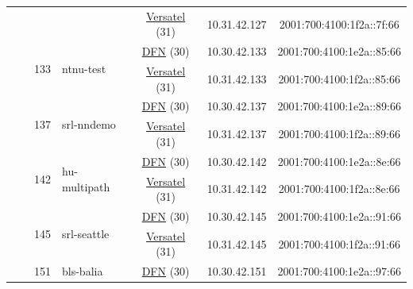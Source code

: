 \begin{small}
\begin{center}
\begin{longtable}{|c|c|c|c|c|c|c|c|}
  &  &  &  & \multicolumn{2}{|c|}{\tiny{\href{http://www.versatel.de}{Versatel} (31)}} & \tiny{10.31.42.127} & \tiny{2001:700:4100:1f2a::7f:66} \\* \cline{3-3}\cline{4-4}\cline{5-5}\cline{6-6}\cline{7-7}\cline{8-8}
  &  & \multirow{2}{*}{\tiny{133}} & \multicolumn{1}{|l|}{\multirow{2}{*}{\tiny{ntnu-test}}} & \multicolumn{2}{|c|}{\tiny{\href{https://www.dfn.de}{DFN} (30)}} & \tiny{10.30.42.133} & \tiny{2001:700:4100:1e2a::85:66} \\* \cline{5-5}\cline{6-6}\cline{7-7}\cline{8-8}
  &  &  &  & \multicolumn{2}{|c|}{\tiny{\href{http://www.versatel.de}{Versatel} (31)}} & \tiny{10.31.42.133} & \tiny{2001:700:4100:1f2a::85:66} \\* \cline{3-3}\cline{4-4}\cline{5-5}\cline{6-6}\cline{7-7}\cline{8-8}
  &  & \multirow{2}{*}{\tiny{137}} & \multicolumn{1}{|l|}{\multirow{2}{*}{\tiny{srl-nndemo}}} & \multicolumn{2}{|c|}{\tiny{\href{https://www.dfn.de}{DFN} (30)}} & \tiny{10.30.42.137} & \tiny{2001:700:4100:1e2a::89:66} \\* \cline{5-5}\cline{6-6}\cline{7-7}\cline{8-8}
  &  &  &  & \multicolumn{2}{|c|}{\tiny{\href{http://www.versatel.de}{Versatel} (31)}} & \tiny{10.31.42.137} & \tiny{2001:700:4100:1f2a::89:66} \\* \cline{3-3}\cline{4-4}\cline{5-5}\cline{6-6}\cline{7-7}\cline{8-8}
  &  & \multirow{2}{*}{\tiny{142}} & \multicolumn{1}{|l|}{\multirow{2}{*}{\tiny{hu-multipath}}} & \multicolumn{2}{|c|}{\tiny{\href{https://www.dfn.de}{DFN} (30)}} & \tiny{10.30.42.142} & \tiny{2001:700:4100:1e2a::8e:66} \\* \cline{5-5}\cline{6-6}\cline{7-7}\cline{8-8}
  &  &  &  & \multicolumn{2}{|c|}{\tiny{\href{http://www.versatel.de}{Versatel} (31)}} & \tiny{10.31.42.142} & \tiny{2001:700:4100:1f2a::8e:66} \\* \cline{3-3}\cline{4-4}\cline{5-5}\cline{6-6}\cline{7-7}\cline{8-8}
  &  & \multirow{2}{*}{\tiny{145}} & \multicolumn{1}{|l|}{\multirow{2}{*}{\tiny{srl-seattle}}} & \multicolumn{2}{|c|}{\tiny{\href{https://www.dfn.de}{DFN} (30)}} & \tiny{10.30.42.145} & \tiny{2001:700:4100:1e2a::91:66} \\* \cline{5-5}\cline{6-6}\cline{7-7}\cline{8-8}
  &  &  &  & \multicolumn{2}{|c|}{\tiny{\href{http://www.versatel.de}{Versatel} (31)}} & \tiny{10.31.42.145} & \tiny{2001:700:4100:1f2a::91:66} \\* \cline{3-3}\cline{4-4}\cline{5-5}\cline{6-6}\cline{7-7}\cline{8-8}
  &  & \multirow{2}{*}{\tiny{151}} & \multicolumn{1}{|l|}{\multirow{2}{*}{\tiny{bls-balia}}} & \multicolumn{2}{|c|}{\tiny{\href{https://www.dfn.de}{DFN} (30)}} & \tiny{10.30.42.151} & \tiny{2001:700:4100:1e2a::97:66} \\* \cline{5-5}\cline{6-6}\cline{7-7}\cline{8-8}

\end{longtable}
\end{center}
\end{small}
